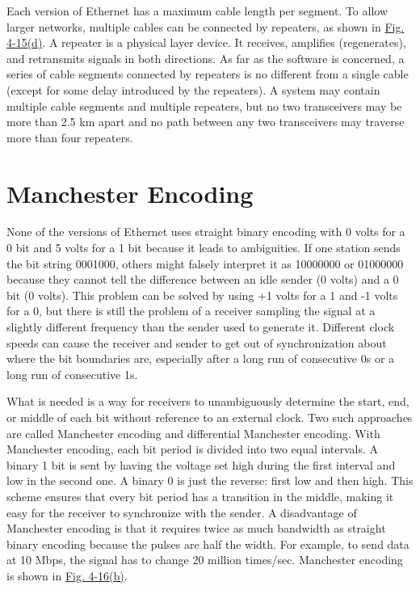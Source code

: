 
Each version of Ethernet has a maximum cable length per segment. To
allow larger networks, multiple cables can be connected by {repeaters},
as shown in
\protect\hyperlink{0130661023_ch04lev1sec3.htmlux5cux23ch04fig15}{Fig.
4-15(d)}. A repeater is a physical layer device. It receives, amplifies
(regenerates), and retransmits signals in both directions. As far as the
software is concerned, a series of cable segments connected by repeaters
is no different from a single cable (except for some delay introduced by
the repeaters). A system may contain multiple cable segments and
multiple repeaters, but no two transceivers may be more than 2.5 km
apart and no path between any two transceivers may traverse more than
four repeaters.

\protect\hypertarget{0130661023_ch04lev1sec3.htmlux5cux23ch04lev2sec10}{}{}

\section{Manchester Encoding}

None of the versions of Ethernet uses straight binary encoding with 0
volts for a 0 bit and 5 volts for a 1 bit because it leads to
ambiguities. If one station sends the bit string 0001000, others might
falsely interpret it as 10000000 or 01000000 because they cannot tell
the difference between an idle sender (0 volts) and a 0 bit (0 volts).
This problem can be solved by using +1 volts for a 1 and -1 volts for a
0, but there is still the problem of a receiver sampling the signal at a
slightly different frequency than the sender used to generate it.
Different clock speeds can cause the receiver and sender to get out of
synchronization about where the bit boundaries are, especially after a
long run of consecutive 0s or a long run of consecutive 1s.

What is needed is a way for receivers to unambiguously determine the
start, end, or middle of each bit without reference to an external
clock. Two such approaches are called {Manchester encoding} and
{differential Manchester encoding}. With Manchester encoding, each bit
period is divided into two equal intervals. A binary 1 bit is sent by
having the voltage set high during the first interval and low in the
second one. A binary 0 is just the reverse: first low and then high.
This scheme ensures that every bit period has a transition in the
middle, making it easy for the receiver to synchronize with the sender.
A disadvantage of Manchester encoding is that it requires twice as much
bandwidth as straight binary encoding because the pulses are half the
width. For example, to send data at 10 Mbps, the signal has to change 20
million times/sec. Manchester encoding is shown in
\protect\hyperlink{0130661023_ch04lev1sec3.htmlux5cux23ch04fig16}{Fig.
4-16(b)}.

